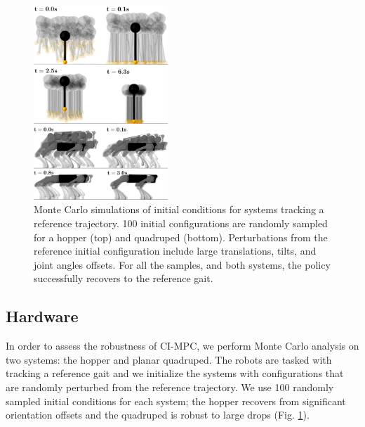 \begin{figure}[t]
	\begin{center}
		\includegraphics[width=0.45\textwidth]{ci_pc/hopper_2D_monte_carlo.png}
	\end{center}
	\begin{center}
		\includegraphics[width=0.45\textwidth]{ci_pc/quadruped_monte_carlo.png}
	\end{center}
	\caption[Monte Carlo CI-MPC policy test for hopper and planar quadruped]{Monte Carlo simulations of initial conditions for systems tracking a reference trajectory. 100 initial configurations are randomly sampled for a hopper (top) and quadruped (bottom). Perturbations from the reference initial configuration include large translations, tilts, and joint angles offsets. For all the samples, and both systems, the policy successfully recovers to the reference gait.}
	\label{cipc_monte_carlo}
\end{figure}

\subsection{Hardware}
In order to assess the robustness of CI-MPC, we perform Monte Carlo analysis on two systems: the hopper and planar quadruped. The robots are tasked with tracking a reference gait and we initialize the systems with configurations that are randomly perturbed from the reference trajectory. We use 100 randomly sampled initial conditions for each system; the hopper recovers from significant orientation offsets and the quadruped is robust to large drops (Fig. \ref{cipc_monte_carlo}).

